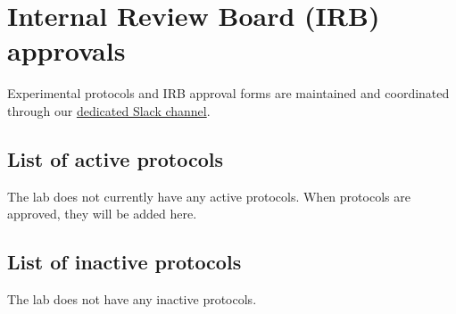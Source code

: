 \documentclass{tufte-book} %
\begin{document}
\chapter{Internal Review Board (IRB) approvals}
Experimental  protocols and IRB approval forms are maintained and
coordinated through our
\href{https://context-lab.slack.com/archives/admin}{dedicated Slack
  channel}.

 \section{List of active protocols}
The lab does not currently have any active protocols.  When protocols
are approved, they will be added here.

 \section{List of inactive protocols}
The lab does not have any inactive protocols.










\end{document}
